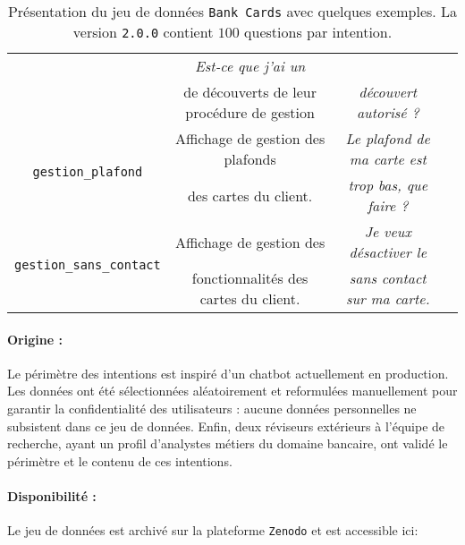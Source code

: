 \begin{table}[!htb]
\begin{center}
\begin{scriptsize}
\begin{tabular}{|c|c|c|c|}
					& \textit{Est-ce que j'ai un}
					\tabularnewline
					& de découverts de leur procédure de gestion
					& \textit{découvert autorisé ?}
					\tabularnewline
					\hline
				\multirow{2}{*}{\texttt{gestion\_plafond}}
					& Affichage de gestion des plafonds
					& \textit{Le plafond de ma carte est}
					\tabularnewline
					& des cartes du client.
					& \textit{trop bas, que faire ?}
					\tabularnewline
					\hline
				\multirow{2}{*}{\texttt{gestion\_sans\_contact}}
					& Affichage de gestion des
					& \textit{Je veux désactiver le}
					\tabularnewline
					& fonctionnalités des cartes du client.
					& \textit{sans contact sur ma carte.}
					\tabularnewline
					\hline
			\end{tabular}
			\end{scriptsize}
			\end{center}
			\caption{
				Présentation du jeu de données \texttt{Bank Cards} avec quelques exemples.
				La version \texttt{2.0.0} contient $100$ questions par intention.
			}
			\label{table:A.1-DATASET-BANK-CARDS}
		\end{table}
		
		\paragraph{Origine :}
		Le périmètre des intentions est inspiré d'un chatbot actuellement en production.
		Les données ont été sélectionnées aléatoirement et reformulées manuellement pour garantir la confidentialité des utilisateurs : aucune données personnelles ne subsistent dans ce jeu de données.
		Enfin, deux réviseurs extérieurs à l'équipe de recherche, ayant un profil d'analystes métiers du domaine bancaire, ont validé le périmètre et le contenu de ces intentions.
		
		\paragraph{Disponibilité :}
		Le jeu de données est archivé sur la plateforme \texttt{Zenodo} et est accessible ici: \cite{schild:2022:french-trainset-chatbots}


